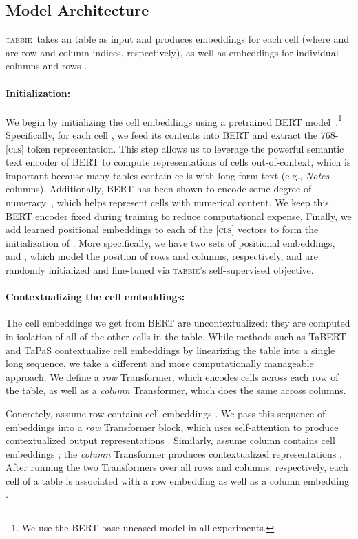 \documentclass[11pt]{article}
\newcommand{\name}[0]{\textsc{tabbie}}
\begin{document}
\newcommand*{\Scale}[2][4]{\scalebox{#1}{}}

\subsection{Model Architecture} 

\name\ takes an  table as input and produces  embeddings  for each cell (where  and  are row and column indices, respectively), as well as embeddings for individual columns  and rows . 

\paragraph{Initialization:} We begin by initializing the cell embeddings  using a pretrained BERT model~\citep{devlin2018bert}.\footnote{We use the BERT-base-uncased model in all experiments.} Specifically, for each cell , we feed its contents into BERT and extract the 768- \textsc{[cls]} token representation. This step allows us to leverage the powerful semantic text encoder of BERT to compute representations of cells out-of-context, which is important because many tables contain cells with long-form text (e.g., \emph{Notes} columns). Additionally, BERT has been shown to encode some degree of numeracy~\citep{Wallace2019Numeracy}, which helps represent cells with numerical content. We keep this BERT encoder fixed during training to reduce computational expense. Finally, we add learned positional embeddings to each of the \textsc{[cls]} vectors to form the initialization of . More specifically, we have two sets of positional embeddings,  and , which model the position of rows and columns, respectively, and are randomly initialized and fine-tuned via \name's self-supervised objective.

\paragraph{Contextualizing the cell embeddings:}
The cell embeddings we get from BERT are uncontextualized: they are computed in isolation of all of the other cells in the table. While methods such as TaBERT and TaPaS contextualize cell embeddings by linearizing the table into a single long sequence, we take a different and more computationally manageable approach. We define a \emph{row} Transformer, which encodes cells across each row of the table, as well as a \emph{column} Transformer, which does the same across columns. 

Concretely, assume row  contains cell embeddings . We pass this sequence of embeddings into a \emph{row} Transformer block, which uses self-attention to produce contextualized output representations . Similarly, assume column  contains cell embeddings ; the \emph{column} Transformer produces contextualized representations . After running the two Transformers over all rows and columns, respectively, each cell  of a table is associated with a row embedding  as well as a column embedding . 
\end{document}
